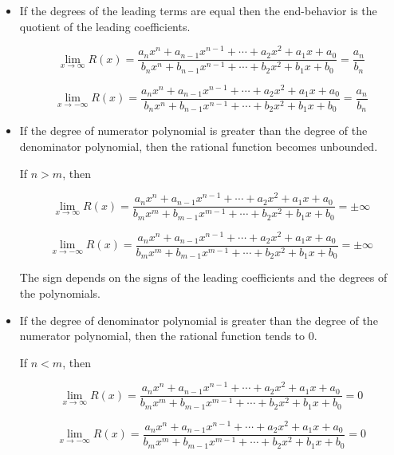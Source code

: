 \documentclass{ximera}
\begin{document}
\begin{itemize}
\item If the degrees of the leading terms are equal then the end-behavior is the quotient of the leading coefficients.


\[   \lim\limits_{x \to \infty} R(x) = \frac{a_n x^n + a_{n-1} x^{n-1} + \cdots + a_2 x^2 + a_1 x + a_0}{b_n x^n + b_{n-1} x^{n-1} + \cdots + b_2 x^2 + b_1 x + b_0}  = \frac{a_n}{b_n}      \]


\[   \lim\limits_{x \to -\infty} R(x) = \frac{a_n x^n + a_{n-1} x^{n-1} + \cdots + a_2 x^2 + a_1 x + a_0}{b_n x^n + b_{n-1} x^{n-1} + \cdots + b_2 x^2 + b_1 x + b_0}  = \frac{a_n}{b_n}      \]



\item If the degree of numerator polynomial is greater than the degree of the denominator polynomial, then the rational function becomes unbounded.

If $n > m$, then 

\[   \lim\limits_{x \to \infty} R(x) = \frac{a_n x^n + a_{n-1} x^{n-1} + \cdots + a_2 x^2 + a_1 x + a_0}{b_m x^m + b_{m-1} x^{m-1} + \cdots + b_2 x^2 + b_1 x + b_0} = \pm\infty       \]


\[   \lim\limits_{x \to -\infty} R(x) = \frac{a_n x^n + a_{n-1} x^{n-1} + \cdots + a_2 x^2 + a_1 x + a_0}{b_m x^m + b_{m-1} x^{m-1} + \cdots + b_2 x^2 + b_1 x + b_0} = \pm\infty       \]

The sign depends on the signs of the leading coefficients and the degrees of the polynomials.


\item If the degree of denominator polynomial is greater than the degree of the numerator polynomial, then the rational function tends to $0$.

If $n < m$, then 

\[   \lim\limits_{x \to \infty} R(x) = \frac{a_n x^n + a_{n-1} x^{n-1} + \cdots + a_2 x^2 + a_1 x + a_0}{b_m x^m + b_{m-1} x^{m-1} + \cdots + b_2 x^2 + b_1 x + b_0} = 0      \]


\[   \lim\limits_{x \to -\infty} R(x) = \frac{a_n x^n + a_{n-1} x^{n-1} + \cdots + a_2 x^2 + a_1 x + a_0}{b_m x^m + b_{m-1} x^{m-1} + \cdots + b_2 x^2 + b_1 x + b_0} = 0      \]

\end{itemize}
\end{document}
